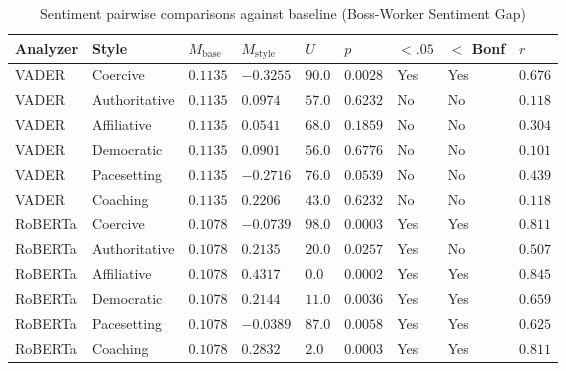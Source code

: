 \begin{table}[htbp]
  \centering
  \small
  \setlength{\tabcolsep}{2pt}
  \caption{Sentiment pairwise comparisons against baseline (Boss-Worker Sentiment Gap)}
  \label{tab:03-sentiment-pairwise-boss-worker-sentiment-gap}
\begin{tabular}{>{\raggedright\arraybackslash}p{2.4cm}>{\raggedright\arraybackslash}p{2.0cm}>{\raggedleft\arraybackslash}p{1.6cm}>{\raggedleft\arraybackslash}p{1.6cm}>{\raggedleft\arraybackslash}p{1.3cm}>{\raggedleft\arraybackslash}p{1.8cm}>{\centering\arraybackslash}p{1.2cm}>{\centering\arraybackslash}p{1.5cm}>{\raggedleft\arraybackslash}p{1.2cm}}
    \toprule
    Analyzer & Style & $M_{\text{base}}$ & $M_{\text{style}}$ & $U$ & $p$ & $<.05$ & $<$ Bonf & $r$ \\
    \midrule
    VADER & Coercive & $0.1135$ & $-0.3255$ & $90.0$ & $0.0028$ & Yes & Yes & $0.676$ \\
    VADER & Authoritative & $0.1135$ & $0.0974$ & $57.0$ & $0.6232$ & No & No & $0.118$ \\
    VADER & Affiliative & $0.1135$ & $0.0541$ & $68.0$ & $0.1859$ & No & No & $0.304$ \\
    VADER & Democratic & $0.1135$ & $0.0901$ & $56.0$ & $0.6776$ & No & No & $0.101$ \\
    VADER & Pacesetting & $0.1135$ & $-0.2716$ & $76.0$ & $0.0539$ & No & No & $0.439$ \\
    VADER & Coaching & $0.1135$ & $0.2206$ & $43.0$ & $0.6232$ & No & No & $0.118$ \\
    RoBERTa & Coercive & $0.1078$ & $-0.0739$ & $98.0$ & $0.0003$ & Yes & Yes & $0.811$ \\
    RoBERTa & Authoritative & $0.1078$ & $0.2135$ & $20.0$ & $0.0257$ & Yes & No & $0.507$ \\
    RoBERTa & Affiliative & $0.1078$ & $0.4317$ & $0.0$ & $0.0002$ & Yes & Yes & $0.845$ \\
    RoBERTa & Democratic & $0.1078$ & $0.2144$ & $11.0$ & $0.0036$ & Yes & Yes & $0.659$ \\
    RoBERTa & Pacesetting & $0.1078$ & $-0.0389$ & $87.0$ & $0.0058$ & Yes & Yes & $0.625$ \\
    RoBERTa & Coaching & $0.1078$ & $0.2832$ & $2.0$ & $0.0003$ & Yes & Yes & $0.811$ \\
    \bottomrule
\end{tabular}%
\end{table}

